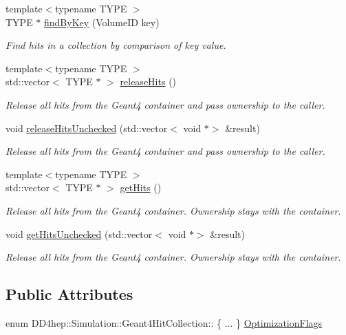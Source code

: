 \begin{DoxyCompactItemize}
{\footnotesize template$<$typename T\+Y\+PE $>$ }\\T\+Y\+PE $\ast$ \hyperlink{class_d_d4hep_1_1_simulation_1_1_geant4_hit_collection_a1e2bf3283a0d710932de88d883bba9a4}{find\+By\+Key} (Volume\+ID key)
\begin{DoxyCompactList}\small\item\em Find hits in a collection by comparison of key value. \end{DoxyCompactList}\item 
{\footnotesize template$<$typename T\+Y\+PE $>$ }\\std\+::vector$<$ T\+Y\+PE $\ast$ $>$ \hyperlink{class_d_d4hep_1_1_simulation_1_1_geant4_hit_collection_a993344637917118c758aeea4b42892b8}{release\+Hits} ()
\begin{DoxyCompactList}\small\item\em Release all hits from the Geant4 container and pass ownership to the caller. \end{DoxyCompactList}\item 
void \hyperlink{class_d_d4hep_1_1_simulation_1_1_geant4_hit_collection_a720c9fea086f4c4ae778f371ed778b44}{release\+Hits\+Unchecked} (std\+::vector$<$ void $\ast$$>$ \&result)
\begin{DoxyCompactList}\small\item\em Release all hits from the Geant4 container and pass ownership to the caller. \end{DoxyCompactList}\item 
{\footnotesize template$<$typename T\+Y\+PE $>$ }\\std\+::vector$<$ T\+Y\+PE $\ast$ $>$ \hyperlink{class_d_d4hep_1_1_simulation_1_1_geant4_hit_collection_ae0023e68cc7074adb4cf960696881d42}{get\+Hits} ()
\begin{DoxyCompactList}\small\item\em Release all hits from the Geant4 container. Ownership stays with the container. \end{DoxyCompactList}\item 
void \hyperlink{class_d_d4hep_1_1_simulation_1_1_geant4_hit_collection_afbf1de2a1cffd05688fe0573fc32220b}{get\+Hits\+Unchecked} (std\+::vector$<$ void $\ast$$>$ \&result)
\begin{DoxyCompactList}\small\item\em Release all hits from the Geant4 container. Ownership stays with the container. \end{DoxyCompactList}\end{DoxyCompactItemize}
\subsection*{Public Attributes}
\begin{DoxyCompactItemize}
\item 
enum D\+D4hep\+::\+Simulation\+::\+Geant4\+Hit\+Collection\+:: \{ ... \}  \hyperlink{class_d_d4hep_1_1_simulation_1_1_geant4_hit_collection_a7f71d7699e398712740081192f4dd846}{Optimization\+Flags}
\end{DoxyCompactItemize}
